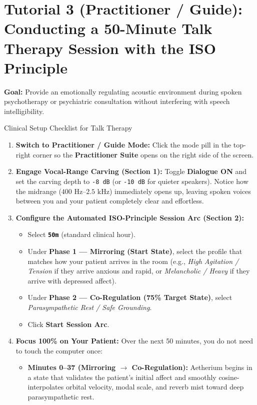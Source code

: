 \documentclass[11pt,oneside,openany]{book}
\begin{document}
\section{Tutorial 3 (Practitioner / Guide): Conducting a 50-Minute Talk Therapy Session with the ISO Principle}

\textbf{Goal:} Provide an emotionally regulating acoustic environment during spoken psychotherapy or psychiatric consultation without interfering with speech intelligibility.

\begin{clinicalbox}{Clinical Setup Checklist for Talk Therapy}
\begin{enumerate}
  \item \textbf{Switch to Practitioner / Guide Mode:} Click the mode pill in the top-right corner so the \textbf{Practitioner Suite} opens on the right side of the screen.
  \item \textbf{Engage Vocal-Range Carving (Section 1):} Toggle \textbf{Dialogue ON} and set the carving depth to \texttt{-8 dB} (or \texttt{-10 dB} for quieter speakers). Notice how the midrange ($400\text{ Hz} \text{--} 2.5\text{ kHz}$) immediately opens up, leaving spoken voices between you and your patient completely clear and effortless.
  \item \textbf{Configure the Automated ISO-Principle Session Arc (Section 2):}
    \begin{itemize}
      \item Select \textbf{\texttt{50m}} (standard clinical hour).
      \item Under \textbf{Phase 1 --- Mirroring (Start State)}, select the profile that matches how your patient arrives in the room (e.g., \textit{High Agitation / Tension} if they arrive anxious and rapid, or \textit{Melancholic / Heavy} if they arrive with depressed affect).
      \item Under \textbf{Phase 2 --- Co-Regulation (75\% Target State)}, select \textit{Parasympathetic Rest / Safe Grounding}.
      \item Click \textbf{Start Session Arc}.
    \end{itemize}
  \item \textbf{Focus 100\% on Your Patient:} Over the next 50 minutes, you do not need to touch the computer once:
    \begin{itemize}
      \item \textbf{Minutes 0--37 (Mirroring $\rightarrow$ Co-Regulation):} Aetherium begins in a state that validates the patient's initial affect and smoothly cosine-interpolates orbital velocity, modal scale, and reverb mist toward deep parasympathetic rest.

\end{itemize}
\end{enumerate}
\end{clinicalbox}
\end{document}
